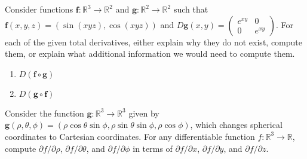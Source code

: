 \documentclass{ximera}
\begin{document}
\begin{problem}
Consider functions $\mathbf{f}:\mathbb{R}^3\rightarrow\mathbb{R}^2$ and $\mathbf{g}:\mathbb{R}^2\rightarrow\mathbb{R}^2$ such that $\mathbf{f}(x,y,z) = (\sin(xyz),\cos(xyz))$ and $D\mathbf{g}(x,y) = \left(\begin{array}{ccc}e^{xy}&0\\0&e^{xy}\end{array}\right)$. For each of the given total derivatives, either explain why they do not exist, compute them, or explain what additional information we would need to compute them.
\begin{enumerate}
\item $D(\mathbf{f}\circ\mathbf{g})$
\item $D(\mathbf{g}\circ\mathbf{f})$
\end{enumerate}
\end{problem}

\begin{problem}
Consider the function $\mathbf{g}:\mathbb{R}^3\rightarrow\mathbb{R}^3$ given by $\mathbf{g}(\rho, \theta, \phi) = (\rho\cos\theta\sin\phi, \rho\sin\theta\sin\phi,\rho\cos\phi)$, which changes spherical coordinates to Cartesian coordinates. For any differentiable function $f:\mathbb{R}^3\rightarrow\mathbb{R}$, compute $\partial f/\partial\rho$, $\partial f/\partial\theta$, and $\partial f/\partial\phi$ in terms of $\partial f/\partial x$, $\partial f/\partial y$, and $\partial f/\partial z$.
\end{problem}
\end{document}
